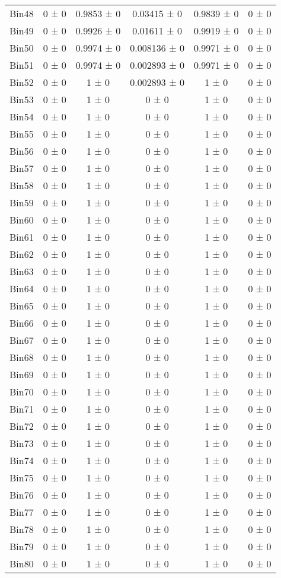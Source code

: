 \begin{tabular}{@{\extracolsep{4pt}}lccccc@{}}
     Bin48 & 0 ± 0 & 0.9853 ± 0 & 0.03415 ± 0 & 0.9839 ± 0 & 0 ± 0 \\ 
     Bin49 & 0 ± 0 & 0.9926 ± 0 & 0.01611 ± 0 & 0.9919 ± 0 & 0 ± 0 \\ 
     Bin50 & 0 ± 0 & 0.9974 ± 0 & 0.008136 ± 0 & 0.9971 ± 0 & 0 ± 0 \\ 
     Bin51 & 0 ± 0 & 0.9974 ± 0 & 0.002893 ± 0 & 0.9971 ± 0 & 0 ± 0 \\ 
     Bin52 & 0 ± 0 & 1 ± 0 & 0.002893 ± 0 & 1 ± 0 & 0 ± 0 \\ 
     Bin53 & 0 ± 0 & 1 ± 0 & 0 ± 0 & 1 ± 0 & 0 ± 0 \\ 
     Bin54 & 0 ± 0 & 1 ± 0 & 0 ± 0 & 1 ± 0 & 0 ± 0 \\ 
     Bin55 & 0 ± 0 & 1 ± 0 & 0 ± 0 & 1 ± 0 & 0 ± 0 \\ 
     Bin56 & 0 ± 0 & 1 ± 0 & 0 ± 0 & 1 ± 0 & 0 ± 0 \\ 
     Bin57 & 0 ± 0 & 1 ± 0 & 0 ± 0 & 1 ± 0 & 0 ± 0 \\ 
     Bin58 & 0 ± 0 & 1 ± 0 & 0 ± 0 & 1 ± 0 & 0 ± 0 \\ 
     Bin59 & 0 ± 0 & 1 ± 0 & 0 ± 0 & 1 ± 0 & 0 ± 0 \\ 
     Bin60 & 0 ± 0 & 1 ± 0 & 0 ± 0 & 1 ± 0 & 0 ± 0 \\ 
     Bin61 & 0 ± 0 & 1 ± 0 & 0 ± 0 & 1 ± 0 & 0 ± 0 \\ 
     Bin62 & 0 ± 0 & 1 ± 0 & 0 ± 0 & 1 ± 0 & 0 ± 0 \\ 
     Bin63 & 0 ± 0 & 1 ± 0 & 0 ± 0 & 1 ± 0 & 0 ± 0 \\ 
     Bin64 & 0 ± 0 & 1 ± 0 & 0 ± 0 & 1 ± 0 & 0 ± 0 \\ 
     Bin65 & 0 ± 0 & 1 ± 0 & 0 ± 0 & 1 ± 0 & 0 ± 0 \\ 
     Bin66 & 0 ± 0 & 1 ± 0 & 0 ± 0 & 1 ± 0 & 0 ± 0 \\ 
     Bin67 & 0 ± 0 & 1 ± 0 & 0 ± 0 & 1 ± 0 & 0 ± 0 \\ 
     Bin68 & 0 ± 0 & 1 ± 0 & 0 ± 0 & 1 ± 0 & 0 ± 0 \\ 
     Bin69 & 0 ± 0 & 1 ± 0 & 0 ± 0 & 1 ± 0 & 0 ± 0 \\ 
     Bin70 & 0 ± 0 & 1 ± 0 & 0 ± 0 & 1 ± 0 & 0 ± 0 \\ 
     Bin71 & 0 ± 0 & 1 ± 0 & 0 ± 0 & 1 ± 0 & 0 ± 0 \\ 
     Bin72 & 0 ± 0 & 1 ± 0 & 0 ± 0 & 1 ± 0 & 0 ± 0 \\ 
     Bin73 & 0 ± 0 & 1 ± 0 & 0 ± 0 & 1 ± 0 & 0 ± 0 \\ 
     Bin74 & 0 ± 0 & 1 ± 0 & 0 ± 0 & 1 ± 0 & 0 ± 0 \\ 
     Bin75 & 0 ± 0 & 1 ± 0 & 0 ± 0 & 1 ± 0 & 0 ± 0 \\ 
     Bin76 & 0 ± 0 & 1 ± 0 & 0 ± 0 & 1 ± 0 & 0 ± 0 \\ 
     Bin77 & 0 ± 0 & 1 ± 0 & 0 ± 0 & 1 ± 0 & 0 ± 0 \\ 
     Bin78 & 0 ± 0 & 1 ± 0 & 0 ± 0 & 1 ± 0 & 0 ± 0 \\ 
     Bin79 & 0 ± 0 & 1 ± 0 & 0 ± 0 & 1 ± 0 & 0 ± 0 \\ 
     Bin80 & 0 ± 0 & 1 ± 0 & 0 ± 0 & 1 ± 0 & 0 ± 0 \\ 
\hline\hline
  \end{tabular}
